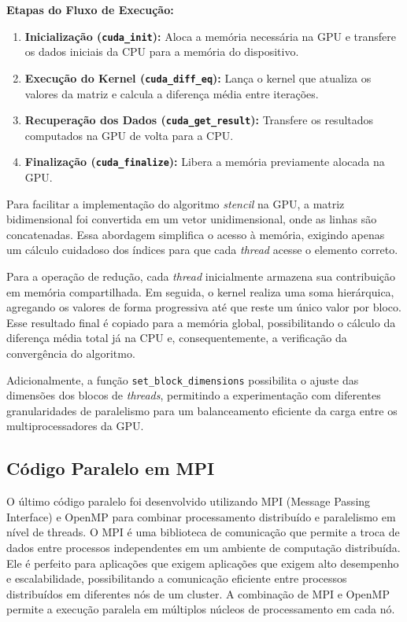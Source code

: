 \documentclass[12pt]{article}
\begin{document}
\textbf{Etapas do Fluxo de Execução:}
\begin{enumerate}
  \item \textbf{Inicialização (\texttt{cuda\_init}):}
        Aloca a memória necessária na GPU e transfere os dados iniciais da CPU para a memória do dispositivo.
  \item \textbf{Execução do Kernel (\texttt{cuda\_diff\_eq}):}
        Lança o kernel que atualiza os valores da matriz e calcula a diferença média entre iterações.
  \item \textbf{Recuperação dos Dados (\texttt{cuda\_get\_result}):}
        Transfere os resultados computados na GPU de volta para a CPU.
  \item \textbf{Finalização (\texttt{cuda\_finalize}):}
        Libera a memória previamente alocada na GPU.
\end{enumerate}

Para facilitar a implementação do algoritmo \textit{stencil} na GPU, a matriz
bidimensional foi convertida em um vetor unidimensional, onde as linhas são
concatenadas. Essa abordagem simplifica o acesso à memória, exigindo apenas um
cálculo cuidadoso dos índices para que cada \textit{thread} acesse o elemento
correto.

Para a operação de redução, cada \textit{thread} inicialmente armazena sua
contribuição em memória compartilhada. Em seguida, o kernel realiza uma soma
hierárquica, agregando os valores de forma progressiva até que reste um único
valor por bloco. Esse resultado final é copiado para a memória global,
possibilitando o cálculo da diferença média total já na CPU e,
consequentemente, a verificação da convergência do algoritmo.

Adicionalmente, a função \texttt{set\_block\_dimensions} possibilita o ajuste
das dimensões dos blocos de \textit{threads}, permitindo a experimentação com
diferentes granularidades de paralelismo para um balanceamento eficiente da
carga entre os multiprocessadores da GPU.

\subsection{Código Paralelo em MPI}

O último código paralelo foi desenvolvido utilizando MPI (Message Passing
Interface) e OpenMP para combinar processamento distribuído e paralelismo em
nível de threads. O MPI é uma biblioteca de comunicação que permite a troca de
dados entre processos independentes em um ambiente de computação distribuída.
Ele é perfeito para aplicações que exigem aplicações que exigem alto desempenho
e escalabilidade, possibilitando a comunicação eficiente entre processos
distribuídos em diferentes nós de um cluster. A combinação de MPI e OpenMP
permite a execução paralela em múltiplos núcleos de processamento em cada nó.
\end{document}
